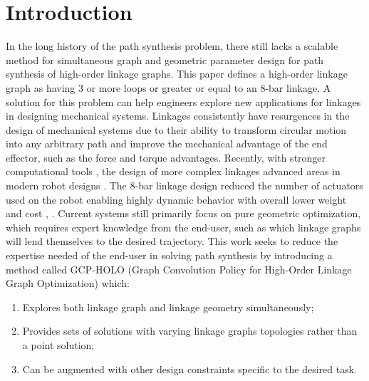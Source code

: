 \section{Introduction}
In the long history of the path synthesis problem, there still lacks a scalable method for simultaneous graph and geometric parameter design for path synthesis of high-order linkage graphs. This paper defines a high-order linkage graph as having 3 or more loops or greater or equal to an 8-bar linkage. A solution for this problem can help engineers explore new applications for linkages in designing mechanical systems. Linkages consistently have resurgences in the design of mechanical systems due to their ability to transform circular motion into any arbitrary path and improve the mechanical advantage of the end effector, such as the force and torque advantages. Recently, with stronger computational tools \cite{plecnik_computational_2016}, the design of more complex linkages advanced areas in modern robot designs \cite{ramezani_bat_2016, FestoUSA2018BionicFlyingFox, plecnik_design_2017}.  The 8-bar linkage design reduced the number of actuators used on the robot enabling highly dynamic behavior with overall lower weight and cost \cite{ramezani_bat_2016}, \cite{plecnik_design_2017}. Current systems still primarily focus on pure geometric optimization, which requires expert knowledge from the end-user, such as which linkage graphs will lend themselves to the desired trajectory. This work seeks to reduce the expertise needed of the end-user in solving path synthesis by introducing a method called GCP-HOLO (Graph Convolution Policy for High-Order Linkage Graph Optimization) which: 
\begin{enumerate}
    \item Explores both linkage graph and linkage geometry simultaneously;
    \item Provides sets of solutions with varying linkage graphs topologies rather than a point solution; 
    \item Can be augmented with other design constraints specific to the desired task.
\end{enumerate}
